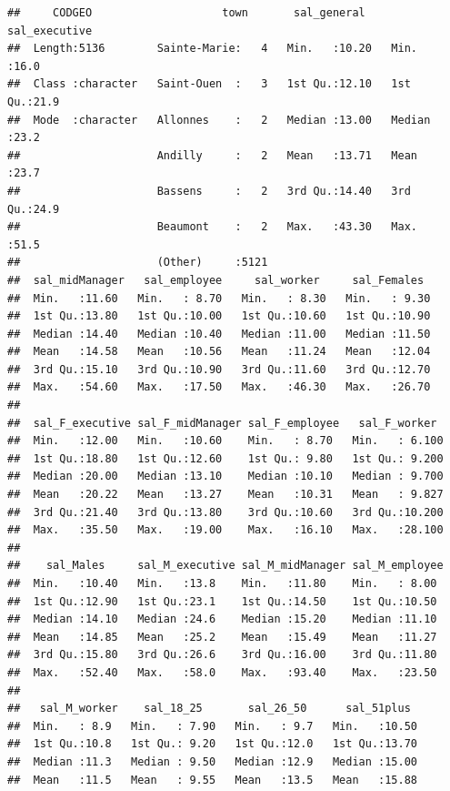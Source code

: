 \documentclass[]{article}
\begin{document}
\begin{verbatim}
##     CODGEO                    town       sal_general    sal_executive 
##  Length:5136        Sainte-Marie:   4   Min.   :10.20   Min.   :16.0  
##  Class :character   Saint-Ouen  :   3   1st Qu.:12.10   1st Qu.:21.9  
##  Mode  :character   Allonnes    :   2   Median :13.00   Median :23.2  
##                     Andilly     :   2   Mean   :13.71   Mean   :23.7  
##                     Bassens     :   2   3rd Qu.:14.40   3rd Qu.:24.9  
##                     Beaumont    :   2   Max.   :43.30   Max.   :51.5  
##                     (Other)     :5121                                 
##  sal_midManager   sal_employee     sal_worker     sal_Females   
##  Min.   :11.60   Min.   : 8.70   Min.   : 8.30   Min.   : 9.30  
##  1st Qu.:13.80   1st Qu.:10.00   1st Qu.:10.60   1st Qu.:10.90  
##  Median :14.40   Median :10.40   Median :11.00   Median :11.50  
##  Mean   :14.58   Mean   :10.56   Mean   :11.24   Mean   :12.04  
##  3rd Qu.:15.10   3rd Qu.:10.90   3rd Qu.:11.60   3rd Qu.:12.70  
##  Max.   :54.60   Max.   :17.50   Max.   :46.30   Max.   :26.70  
##                                                                 
##  sal_F_executive sal_F_midManager sal_F_employee   sal_F_worker   
##  Min.   :12.00   Min.   :10.60    Min.   : 8.70   Min.   : 6.100  
##  1st Qu.:18.80   1st Qu.:12.60    1st Qu.: 9.80   1st Qu.: 9.200  
##  Median :20.00   Median :13.10    Median :10.10   Median : 9.700  
##  Mean   :20.22   Mean   :13.27    Mean   :10.31   Mean   : 9.827  
##  3rd Qu.:21.40   3rd Qu.:13.80    3rd Qu.:10.60   3rd Qu.:10.200  
##  Max.   :35.50   Max.   :19.00    Max.   :16.10   Max.   :28.100  
##                                                                   
##    sal_Males     sal_M_executive sal_M_midManager sal_M_employee 
##  Min.   :10.40   Min.   :13.8    Min.   :11.80    Min.   : 8.00  
##  1st Qu.:12.90   1st Qu.:23.1    1st Qu.:14.50    1st Qu.:10.50  
##  Median :14.10   Median :24.6    Median :15.20    Median :11.10  
##  Mean   :14.85   Mean   :25.2    Mean   :15.49    Mean   :11.27  
##  3rd Qu.:15.80   3rd Qu.:26.6    3rd Qu.:16.00    3rd Qu.:11.80  
##  Max.   :52.40   Max.   :58.0    Max.   :93.40    Max.   :23.50  
##                                                                  
##   sal_M_worker    sal_18_25       sal_26_50      sal_51plus   
##  Min.   : 8.9   Min.   : 7.90   Min.   : 9.7   Min.   :10.50  
##  1st Qu.:10.8   1st Qu.: 9.20   1st Qu.:12.0   1st Qu.:13.70  
##  Median :11.3   Median : 9.50   Median :12.9   Median :15.00  
##  Mean   :11.5   Mean   : 9.55   Mean   :13.5   Mean   :15.88  

\end{verbatim}
\end{document}
